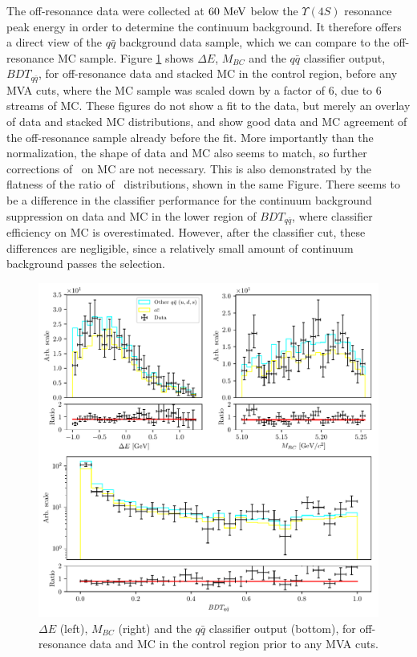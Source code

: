 The off-resonance data were collected at $60\mathrm{~MeV}$ below the $\Upsilon(4S)$ resonance peak energy in order to determine the continuum background. It therefore offers a direct view of the $q\bar q$ background data sample, which we can compare to the off-resonance MC sample. Figure \ref{fig:offres_control} shows $\Delta E$, $M_{BC}$ and the $q \bar q$ classifier output, $BDT_{q\bar q}$, for off-resonance data and stacked MC in the control region, before any MVA cuts, where the MC sample was scaled down by a factor of $6$, due to 6 streams of MC. These figures do not show a fit to the data, but merely an overlay of data and stacked MC distributions, and show good data and MC agreement of the off-resonance sample already before the fit. More importantly than the normalization, the shape of data and MC also seems to match, so further corrections of \vars~on MC are not necessary. This is also demonstrated by the flatness of the ratio of \vars~distributions, shown in the same Figure. There seems to be a difference in the classifier performance for the continuum background suppression on data and MC in the lower region of $BDT_{q \bar q}$, where classifier efficiency on MC is overestimated. However, after the classifier cut, these differences are negligible, since a relatively small amount of continuum background passes the selection.
\begin{figure}[H]
	\centering
	\captionsetup{width=0.8\linewidth}
	\includegraphics[width=\linewidth]{fig/offres_control}
	\caption{$\Delta E$ (left), $M_{BC}$ (right) and the $q \bar q$ classifier output (bottom), for off-resonance data and MC in the control region prior to any MVA cuts.}
	\label{fig:offres_control}
\end{figure}

